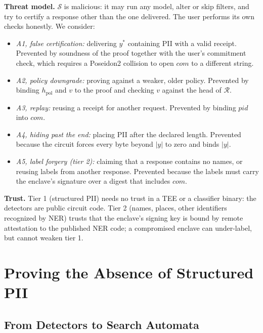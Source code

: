 \documentclass[conference]{IEEEtran}
\begin{document}
\textbf{Threat model.} $\mathcal{S}$ is malicious: it may run any model, alter or skip filters, and try to certify a response other than the one delivered. The user performs its own checks honestly. We consider:
\begin{itemize}[leftmargin=1.1em,itemsep=1pt]
  \item \emph{A1, false certification:} delivering $y^\ast$ containing PII with a valid receipt. Prevented by soundness of the proof together with the user's commitment check, which requires a Poseidon2 collision to open $\mathit{com}$ to a different string.
  \item \emph{A2, policy downgrade:} proving against a weaker, older policy. Prevented by binding $h_{\mathrm{pol}}$ and $v$ to the proof and checking $v$ against the head of $\mathcal{R}$.
  \item \emph{A3, replay:} reusing a receipt for another request. Prevented by binding $\mathit{pid}$ into $\mathit{com}$.
  \item \emph{A4, hiding past the end:} placing PII after the declared length. Prevented because the circuit forces every byte beyond $|y|$ to zero and binds $|y|$.
  \item \emph{A5, label forgery (tier 2):} claiming that a response contains no names, or reusing labels from another response. Prevented because the labels must carry the enclave's signature over a digest that includes $\mathit{com}$.
\end{itemize}
\textbf{Trust.} Tier 1 (structured PII) needs no trust in a TEE or a classifier binary: the detectors are public circuit code. Tier 2 (names, places, other identifiers recognized by NER) trusts that the enclave's signing key is bound by remote attestation to the published NER code; a compromised enclave can under-label, but cannot weaken tier 1.

\section{Proving the Absence of Structured PII}
\label{sec:circuit}

\subsection{From Detectors to Search Automata}
\end{document}
